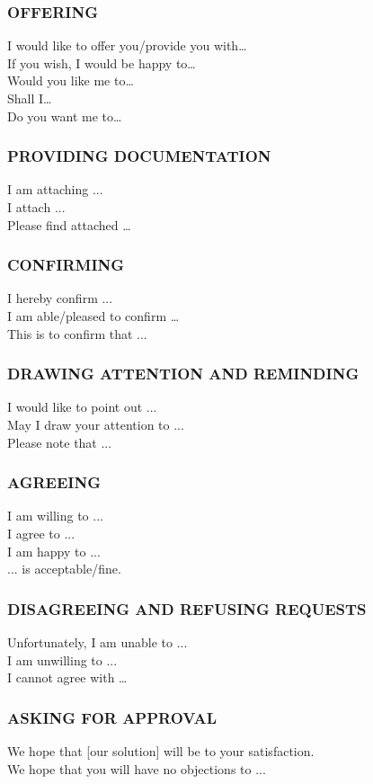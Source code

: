 \subsubsection{OFFERING}
I would like to offer you/provide you with…\\
If you wish, I would be happy to…\\
Would you like me to…\\
Shall I…\\
Do you want me to…\\
\subsubsection{PROVIDING DOCUMENTATION}
I am attaching ...\\
I attach ...\\
Please find attached …\\
\subsubsection{CONFIRMING}
I hereby confirm ...\\
I am able/pleased to confirm …\\
This is to confirm that ...\\
\subsubsection{DRAWING ATTENTION AND REMINDING}
I would like to point out ...\\
May I draw your attention to ...\\
Please note that ...\\
\subsubsection{AGREEING}
I am willing to ...\\
I agree to ...\\
I am happy to ...\\
... is acceptable/fine. \\
\subsubsection{DISAGREEING AND REFUSING REQUESTS}
Unfortunately, I am unable to ...\\
I am unwilling to ...\\
I cannot agree with …\\
\subsubsection{ASKING FOR APPROVAL}
We hope that [our solution] will be to your satisfaction.\\
We hope that you will have no objections to ...\\
